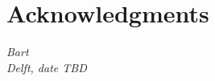 \chapter*{Acknowledgments}

\lipsum[7-8]

\begin{flushright}
{\itshape
Bart \\
Delft, date TBD
}
\end{flushright}
